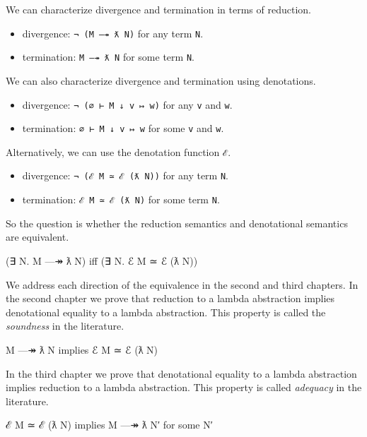 We can characterize divergence and termination in terms of reduction.

\begin{itemize}
\tightlist
\item
  divergence: \texttt{¬\ (M\ —↠\ ƛ\ N)} for any term \texttt{N}.
\item
  termination: \texttt{M\ —↠\ ƛ\ N} for some term \texttt{N}.
\end{itemize}

We can also characterize divergence and termination using denotations.

\begin{itemize}
\tightlist
\item
  divergence: \texttt{¬\ (∅\ ⊢\ M\ ↓\ v\ ↦\ w)} for any \texttt{v} and
  \texttt{w}.
\item
  termination: \texttt{∅\ ⊢\ M\ ↓\ v\ ↦\ w} for some \texttt{v} and
  \texttt{w}.
\end{itemize}

Alternatively, we can use the denotation function \texttt{ℰ}.

\begin{itemize}
\tightlist
\item
  divergence: \texttt{¬\ (ℰ\ M\ ≃\ ℰ\ (ƛ\ N))} for any term \texttt{N}.
\item
  termination: \texttt{ℰ\ M\ ≃\ ℰ\ (ƛ\ N)} for some term \texttt{N}.
\end{itemize}

So the question is whether the reduction semantics and denotational
semantics are equivalent.

\begin{myDisplay}
(∃ N. M —↠ ƛ N)  iff  (∃ N. ℰ M ≃ ℰ (ƛ N))
\end{myDisplay}

We address each direction of the equivalence in the second and third
chapters. In the second chapter we prove that reduction to a lambda
abstraction implies denotational equality to a lambda abstraction. This
property is called the \emph{soundness} in the literature.

\begin{myDisplay}
M —↠ ƛ N  implies  ℰ M ≃ ℰ (ƛ N)
\end{myDisplay}

In the third chapter we prove that denotational equality to a lambda
abstraction implies reduction to a lambda abstraction. This property is
called \emph{adequacy} in the literature.

\begin{myDisplay}
ℰ M ≃ ℰ (ƛ N)  implies M —↠ ƛ N′ for some N′
\end{myDisplay}

